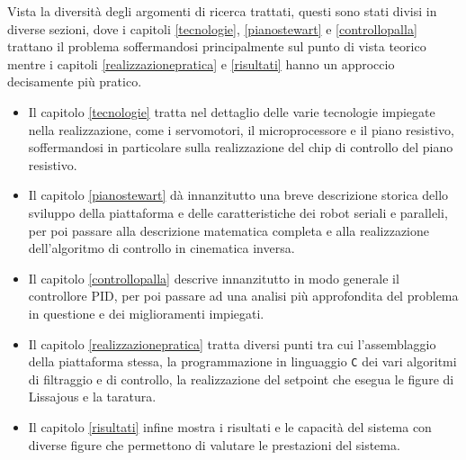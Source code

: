 \documentclass[12pt,twoside,openright]{report}
\begin{document}
Vista la diversità degli argomenti di ricerca trattati, questi sono stati divisi in diverse sezioni, dove i capitoli \ref{tecnologie}, \ref{pianostewart} e \ref{controllopalla} trattano il problema soffermandosi principalmente sul punto di vista teorico mentre i capitoli \ref{realizzazionepratica} e \ref{risultati} hanno un approccio decisamente più pratico. 
\begin{itemize}
\item Il capitolo \ref{tecnologie} tratta nel dettaglio delle varie tecnologie impiegate nella realizzazione, come i servomotori, il microprocessore e il piano resistivo, soffermandosi in particolare sulla realizzazione del chip di controllo del piano resistivo. 
\item Il capitolo \ref{pianostewart} dà innanzitutto una breve descrizione storica dello sviluppo della piattaforma e delle caratteristiche dei robot seriali e paralleli, per poi passare alla descrizione matematica completa e alla realizzazione dell'algoritmo di controllo in cinematica inversa. 
\item Il capitolo \ref{controllopalla} descrive innanzitutto in modo generale il controllore PID, per poi passare ad una analisi più approfondita del problema in questione e dei miglioramenti impiegati. 
\item Il capitolo \ref{realizzazionepratica} tratta diversi punti tra cui l'assemblaggio della piattaforma stessa, la programmazione in linguaggio \texttt{C} dei vari algoritmi di filtraggio e di controllo, la realizzazione del setpoint che esegua le figure di Lissajous e la taratura. 
\item Il capitolo \ref{risultati} infine mostra i risultati e le capacità del sistema con diverse figure che permettono di valutare le prestazioni del sistema.
\end{itemize}

\end{document}
